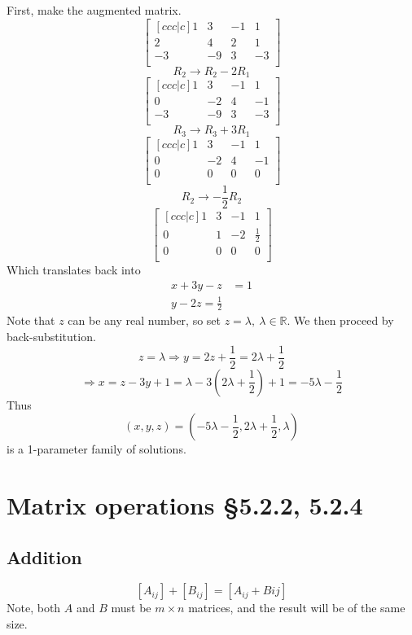 \documentclass[11pt]{article}
\newcommand{\reals}{\mathbb{R}}
\begin{document}
First, make the augmented matrix.
\[
\begin{bmatrix}[ccc|c]
1 & 3 & -1 & 1 \\
2 & 4 & 2 & 1 \\
-3 & -9 & 3 & -3 \\
\end{bmatrix}
\]
\[ R_2 \rightarrow R_2 - 2R_1 \]
\[
\begin{bmatrix}[ccc|c]
1 & 3 & -1 & 1 \\
0 & -2 & 4 & -1 \\
-3 & -9 & 3 & -3 \\
\end{bmatrix}
\]
\[ R_3 \rightarrow R_3 + 3R_1 \]
\[
\begin{bmatrix}[ccc|c]
1 & 3 & -1 & 1 \\
0 & -2 & 4 & -1 \\
0 & 0 & 0 & 0 \\
\end{bmatrix}
\]
\[ R_2 \rightarrow -\frac{1}{2}R_2 \]
\[
\begin{bmatrix}[ccc|c]
1 & 3 & -1 & 1 \\
0 & 1 & -2 & \frac{1}{2} \\
0 & 0 & 0 & 0 \\
\end{bmatrix}
\]
Which translates back into
\begin{align*}
x + 3y - z &= 1 \\
y - 2z = \frac{1}{2}
\end{align*}
Note that $z$ can be any real number, so set $z = \lambda,\ \lambda \in \reals$. We then proceed by back-substitution.
\[ z = \lambda \Rightarrow y = 2z + \frac{1}{2} = 2\lambda + \frac{1}{2} \]
\[ \Rightarrow x = z - 3y + 1 = \lambda - 3 \left( 2\lambda + \frac{1}{2} \right) + 1 = -5\lambda -\frac{1}{2} \]
Thus
\[ (x, y, z) = \left( -5\lambda -\frac{1}{2}, 2\lambda + \frac{1}{2}, \lambda \right)\]
is a 1-parameter family of solutions.

\section{Matrix operations §5.2.2, 5.2.4}
\subsection{Addition}
\[ [A_{ij}] + [B_{ij}] = [A_{ij} + B{ij}] \]
Note, both $A$ and $B$ must be $m \times n$ matrices, and the result will be of the same size.
\end{document}
